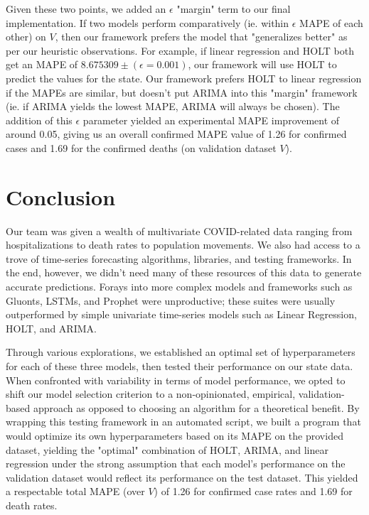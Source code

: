 \documentclass[sigconf,nonacm]{acmart}
\begin{document}
Given these two points, we added an $\epsilon$ "margin" term to our final
implementation. If two models perform comparatively (ie. within $\epsilon$ MAPE
of each other) on $V$, then our framework prefers the model that "generalizes
better" as per our heuristic observations. For example, if linear regression
and HOLT both get an MAPE of $8.675309 \pm (\epsilon = 0.001)$, our framework
will use HOLT to predict the values for the state. Our framework prefers HOLT
to linear regression if the MAPEs are similar, but doesn't put ARIMA into this
"margin" framework (ie. if ARIMA yields the lowest MAPE, ARIMA will always be
chosen). The addition of this $\epsilon$ parameter yielded an experimental 
MAPE improvement of around 0.05, giving us an overall confirmed MAPE value of
1.26 for confirmed cases and 1.69 for the confirmed deaths (on validation
dataset $V$). 


\section{Conclusion}

Our team was given a wealth of multivariate COVID-related data ranging from
hospitalizations to death rates to population movements. We also had access to
a trove of time-series forecasting algorithms, libraries, and testing
frameworks. In the end, however, we didn't need many of these resources of this
data to generate accurate predictions. 
Forays into more complex models and frameworks such as Gluonts, LSTMs, and
Prophet were unproductive; these suites were usually outperformed by simple
univariate time-series models such as Linear Regression, HOLT, and ARIMA. 

Through various explorations, we established an optimal set of hyperparameters
for each of these three models, then tested their performance on our state
data. When confronted with variability in terms of model performance, we opted
to shift our model selection criterion to a non-opinionated, empirical,
validation-based approach as opposed to choosing an algorithm for a theoretical
benefit. By wrapping this testing framework in an automated script, we built a
program that would optimize its own hyperparameters based on its MAPE on the
provided dataset, yielding the "optimal" combination of HOLT, ARIMA, and linear
regression under the strong assumption that each model's performance on the
validation dataset would reflect its performance on the test dataset. 
This yielded a respectable total MAPE (over $V$) of 1.26 for confirmed case
rates and 1.69 for death rates. 
\end{document}
